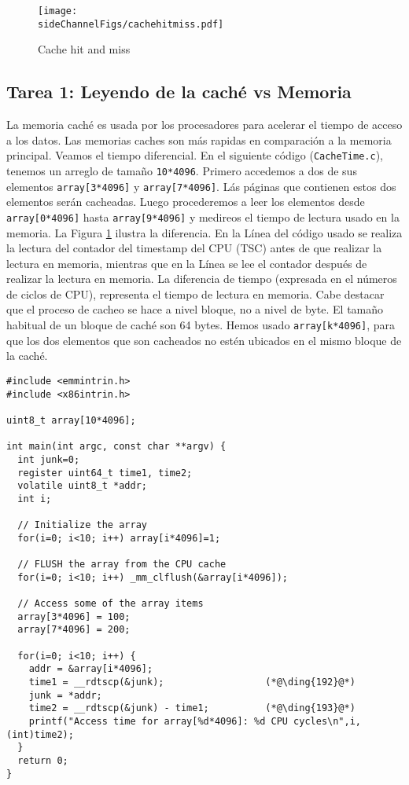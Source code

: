 \begin{figure}[htb]
\centering
\texttt{[image: \\sideChannelFigs/cachehitmiss.pdf]}
\caption{Cache hit and miss}
\label{sidechannel:fig:cachehitmiss}
\end{figure}


\subsection{Tarea 1: Leyendo de la caché vs Memoria }

La memoria caché es usada por los procesadores para acelerar el tiempo de acceso a los datos. Las memorias caches son más rapidas en comparación a la memoria principal.
Veamos el tiempo diferencial. En el siguiente código (\texttt{CacheTime.c}), tenemos un arreglo de tamaño \texttt{10*4096}. Primero accedemos a dos de sus elementos \texttt{array[3*4096]} y \texttt{array[7*4096]}. Lás páginas que contienen estos dos elementos serán cacheadas. Luego procederemos a leer los elementos desde \texttt{array[0*4096]} hasta \texttt{array[9*4096]} y medireos el tiempo de lectura usado en la memoria.
La Figura \ref{sidechannel:fig:cachehitmiss} ilustra la diferencia.
En la Línea  del código usado se realiza la lectura del contador del timestamp del CPU (TSC) antes de que realizar la lectura en memoria, mientras que en la Línea  se lee el contador después de realizar la lectura en memoria. La diferencia de tiempo (expresada en el números de ciclos de CPU), representa el tiempo de lectura en memoria.
Cabe destacar que el proceso de cacheo se hace a nivel bloque, no a nivel de byte. El tamaño habitual de un bloque de caché son 64 bytes. Hemos usado \texttt{array[k*4096]}, para que los dos elementos que son cacheados no estén ubicados en el mismo bloque de la caché. 


\begin{lstlisting}[caption=\texttt{CacheTime.c}]
#include <emmintrin.h>
#include <x86intrin.h>

uint8_t array[10*4096];

int main(int argc, const char **argv) {
  int junk=0;
  register uint64_t time1, time2;
  volatile uint8_t *addr;
  int i;
  
  // Initialize the array
  for(i=0; i<10; i++) array[i*4096]=1;

  // FLUSH the array from the CPU cache
  for(i=0; i<10; i++) _mm_clflush(&array[i*4096]);

  // Access some of the array items
  array[3*4096] = 100;
  array[7*4096] = 200;

  for(i=0; i<10; i++) {
    addr = &array[i*4096];
    time1 = __rdtscp(&junk);                  (*@\ding{192}@*)
    junk = *addr;
    time2 = __rdtscp(&junk) - time1;          (*@\ding{193}@*)
    printf("Access time for array[%d*4096]: %d CPU cycles\n",i, (int)time2);
  }
  return 0;
}
\end{lstlisting}

